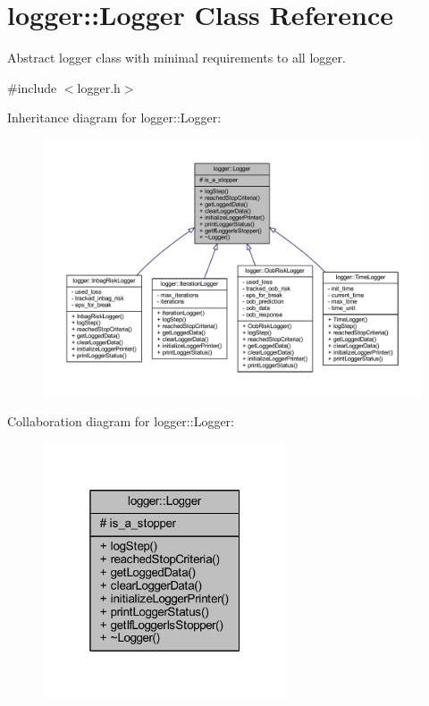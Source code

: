 \hypertarget{classlogger_1_1_logger}{}\section{logger\+:\+:Logger Class Reference}
\label{classlogger_1_1_logger}


Abstract logger class with minimal requirements to all logger.  




{\ttfamily \#include $<$logger.\+h$>$}



Inheritance diagram for logger\+:\+:Logger\+:
\nopagebreak
\begin{figure}[H]
\begin{center}
\leavevmode
\includegraphics[width=350pt]{classlogger_1_1_logger__inherit__graph}
\end{center}
\end{figure}


Collaboration diagram for logger\+:\+:Logger\+:
\nopagebreak
\begin{figure}[H]
\begin{center}
\leavevmode
\includegraphics[width=205pt]{classlogger_1_1_logger__coll__graph}
\end{center}
\end{figure}
